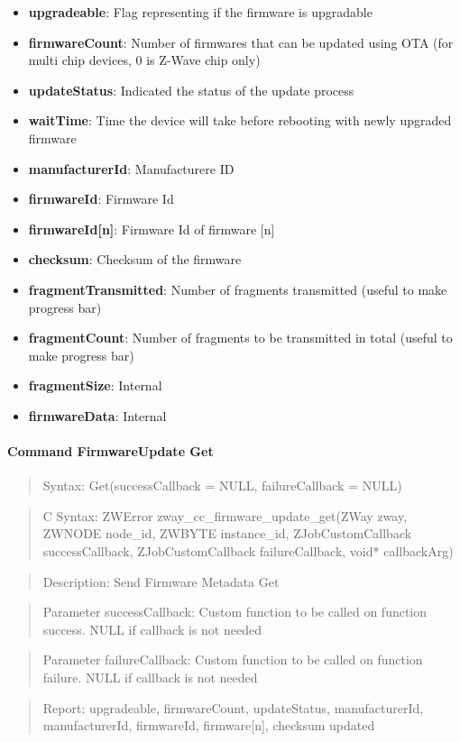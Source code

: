 \begin{itemize}
\item \textbf{upgradeable}: Flag representing if the firmware is upgradable
\item \textbf{firmwareCount}: Number of firmwares that can be updated using OTA (for multi chip devices, 0 is Z-Wave chip only)
\item \textbf{updateStatus}: Indicated the status of the update process
\item \textbf{waitTime}: Time the device will take before rebooting with newly upgraded firmware
\item \textbf{manufacturerId}: Manufacturere ID
\item \textbf{firmwareId}: Firmware Id
\item \textbf{firmwareId[n]}: Firmware Id of firmware [n]
\item \textbf{checksum}: Checksum of the firmware
\item \textbf{fragmentTransmitted}: Number of fragments transmitted (useful to make progress bar)
\item \textbf{fragmentCount}: Number of fragments to be transmitted in total (useful to make progress bar)
\item \textbf{fragmentSize}: Internal
\item \textbf{firmwareData}: Internal
\end{itemize}

\paragraph{Command FirmwareUpdate Get}
\begin{quote}Syntax: Get(successCallback = NULL, failureCallback = NULL)\end{quote}
\begin{quote}C Syntax: ZWError zway\_cc\_firmware\_update\_get(ZWay zway, ZWNODE node\_id, ZWBYTE instance\_id, ZJobCustomCallback successCallback, ZJobCustomCallback failureCallback, void* callbackArg)\end{quote}
\begin{quote}Description: Send Firmware Metadata Get\end{quote}
\begin{quote}Parameter successCallback: Custom function to be called on function success. NULL if callback is not needed\end{quote}
\begin{quote}Parameter failureCallback: Custom function to be called on function failure. NULL if callback is not needed\end{quote}
\begin{quote}Report: upgradeable, firmwareCount, updateStatus, manufacturerId, manufacturerId, firmwareId, firmware[n], checksum updated\end{quote}

